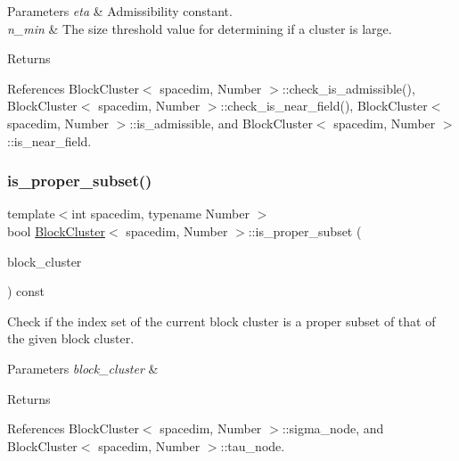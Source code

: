 \begin{DoxyParams}{Parameters}
{\em eta} & Admissibility constant. \\
\hline
{\em n\+\_\+min} & The size threshold value for determining if a cluster is large. \\
\hline
\end{DoxyParams}
\begin{DoxyReturn}{Returns}

\end{DoxyReturn}


References Block\+Cluster$<$ spacedim, Number $>$\+::check\+\_\+is\+\_\+admissible(), Block\+Cluster$<$ spacedim, Number $>$\+::check\+\_\+is\+\_\+near\+\_\+field(), Block\+Cluster$<$ spacedim, Number $>$\+::is\+\_\+admissible, and Block\+Cluster$<$ spacedim, Number $>$\+::is\+\_\+near\+\_\+field.

\mbox{\label{classBlockCluster_a9963a6320591f82824398667bcb9cdf8}} 
\subsubsection{\texorpdfstring{is\+\_\+proper\+\_\+subset()}{is\_proper\_subset()}}
{\footnotesize\ttfamily template$<$int spacedim, typename Number $>$ \\
bool \hyperlink{classBlockCluster}{Block\+Cluster}$<$ spacedim, Number $>$\+::is\+\_\+proper\+\_\+subset (\begin{DoxyParamCaption}\item[{const \hyperlink{classBlockCluster}{Block\+Cluster}$<$ spacedim, Number $>$ \&}]{block\+\_\+cluster }\end{DoxyParamCaption}) const}

Check if the index set of the current block cluster is a proper subset of that of the given block cluster. 
\begin{DoxyParams}{Parameters}
{\em block\+\_\+cluster} & \\
\hline
\end{DoxyParams}
\begin{DoxyReturn}{Returns}

\end{DoxyReturn}


References Block\+Cluster$<$ spacedim, Number $>$\+::sigma\+\_\+node, and Block\+Cluster$<$ spacedim, Number $>$\+::tau\+\_\+node.

